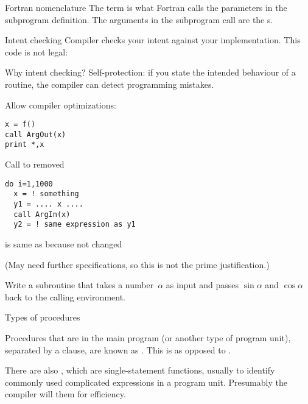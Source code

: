 \begin{block}{Fortran nomenclature}
  \label{sl:fortran-dummy}
  The term  is what Fortran calls the
  parameters in the subprogram definition. The arguments in the
  subprogram call are the s.
\end{block}

\begin{block}{Intent checking}
  \label{sl:fintent}
  Compiler checks your intent against your implementation. This code
  is not legal:

\end{block}

\begin{block}{Why intent checking?}
\label{sl:intentwhy}
Self-protection: if you state the intended behaviour of a routine, the
compiler can detect programming mistakes.

Allow compiler optimizations:

\begin{multicols}{2}
\begin{lstlisting}
x = f()
call ArgOut(x)
print *,x
\end{lstlisting}
Call to  removed
\vfill\columnbreak
\begin{lstlisting}
do i=1,1000
  x = ! something
  y1 = .... x ....
  call ArgIn(x)
  y2 = ! same expression as y1
\end{lstlisting}
 is same as  because  not changed
\end{multicols}
(May need further specifications, so this is not the prime justification.)
\end{block}

\begin{exercise}
  \label{ex:ffunc-sin-cos}
  Write a subroutine  that takes a number~$\alpha$ as input
  and passes $\sin\alpha$ and $\cos\alpha$ back to the calling
  environment.
\end{exercise}

 {Types of procedures}

Procedures that are in the main program (or another type of program
unit), separated by a  clause, are known as
. This is as opposed to
.

There are also , which are
single-statement functions, usually to identify commonly used
complicated expressions in a program unit. Presumably the compiler
will  them for efficiency.

